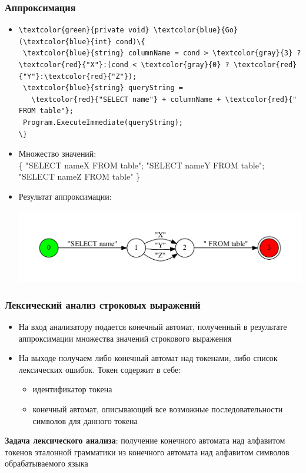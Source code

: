 \documentclass{beamer}
\begin{document}
\begin{frame}[fragile]
\transwipe[direction=90]
\frametitle{Аппроксимация}
\begin{itemize}
\item 
\begin{Verbatim}[commandchars=\\\{\}]
\textcolor{green}{private void} \textcolor{blue}{Go} (\textcolor{blue}{int} cond)\{
 \textcolor{blue}{string} columnName = cond > \textcolor{gray}{3} ? \textcolor{red}{"X"}:(cond < \textcolor{gray}{0} ? \textcolor{red}{"Y"}:\textcolor{red}{"Z"});
 \textcolor{blue}{string} queryString = 
   \textcolor{red}{"SELECT name"} + columnName + \textcolor{red}{" FROM table"};
 Program.ExecuteImmediate(queryString);
\}
\end{Verbatim}

\item Множество значений:\\         
\{ "SELECT nameX FROM table"; "SELECT nameY FROM table"; "SELECT nameZ FROM table" \}

        
\item Результат аппроксимации:
\begin{center}
    {\includegraphics[width=1.0\linewidth]{tsql_test}}
\end{center}

\end{itemize}
\end{frame}


\begin{frame}
\transwipe[direction=90]
\frametitle{Лексический анализ строковых выражений}
\begin{itemize}
\item На вход анализатору подается конечный автомат, полученный в результате аппроксимации множества значений строкового выражения
\item На выходе получаем либо конечный автомат над токенами, либо список лексических ошибок. Токен содержит в себе:
    \begin{itemize}
    \item идентификатор токена
    \item конечный автомат, описывающий все возможные последовательности символов для данного токена
    \end{itemize}
\end{itemize}

\begin{block}{}
\textbf{Задача лексического анализа}: получение конечного автомата над алфавитом токенов эталонной грамматики из конечного автомата над алфавитом символов обрабатываемого языка
\end{block}

\end{frame}
\end{document}

